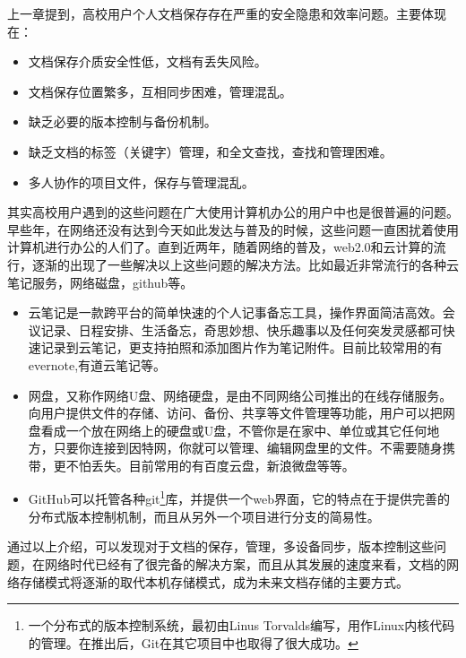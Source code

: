 上一章提到，高校用户个人文档保存存在严重的安全隐患和效率问题。主要体现在：
\begin{itemize}
\item 文档保存介质安全性低，文档有丢失风险。
\item 文档保存位置繁多，互相同步困难，管理混乱。
\item 缺乏必要的版本控制与备份机制。
\item 缺乏文档的标签（关键字）管理，和全文查找，查找和管理困难。
\item 多人协作的项目文件，保存与管理混乱。
\end{itemize}
其实高校用户遇到的这些问题在广大使用计算机办公的用户中也是很普遍的问题。早些年，在网络还没有达到今天如此发达与普及的时候，这些问题一直困扰着使用计算机进行办公的人们了。直到近两年，随着网络的普及，web2.0和云计算的流行，逐渐的出现了一些解决以上这些问题的解决方法。比如最近非常流行的各种云笔记服务，网络磁盘，github等。
\begin{itemize}
\item 云笔记是一款跨平台的简单快速的个人记事备忘工具，操作界面简洁高效。会议记录、日程安排、生活备忘，奇思妙想、快乐趣事以及任何突发灵感都可快速记录到云笔记，更支持拍照和添加图片作为笔记附件。目前比较常用的有evernote,有道云笔记等。
\item 网盘，又称作网络U盘、网络硬盘，是由不同网络公司推出的在线存储服务。向用户提供文件的存储、访问、备份、共享等文件管理等功能，用户可以把网盘看成一个放在网络上的硬盘或U盘，不管你是在家中、单位或其它任何地方，只要你连接到因特网，你就可以管理、编辑网盘里的文件。不需要随身携带，更不怕丢失。目前常用的有百度云盘，新浪微盘等等。
\item GitHub可以托管各种git\footnote{一个分布式的版本控制系统，最初由Linus Torvalds编写，用作Linux内核代码的管理。在推出后，Git在其它项目中也取得了很大成功。}库，并提供一个web界面，它的特点在于提供完善的分布式版本控制机制，而且从另外一个项目进行分支的简易性。
\end{itemize}
通过以上介绍，可以发现对于文档的保存，管理，多设备同步，版本控制这些问题，在网络时代已经有了很完备的解决方案，而且从其发展的速度来看，文档的网络存储模式将逐渐的取代本机存储模式，成为未来文档存储的主要方式。

